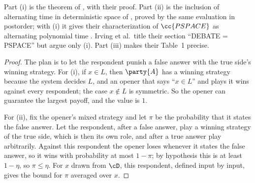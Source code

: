 \begin{refsection}
Part (i) is the theorem of \textcite{IrvingEtAl2018}, with their proof. Part (ii) is the inclusion of alternating time in deterministic space of \textcite[Theorem~3.2]{ChandraKozenStockmeyer1981}, proved by the same evaluation in postorder; with (i) it gives their characterization of $\cc{PSPACE}$ as alternating polynomial time \parencite[Corollary~3.6]{ChandraKozenStockmeyer1981}. Irving et al.\ title their section ``DEBATE = PSPACE'' but argue only (i). Part (iii) makes their Table~1 precise.


\begin{proof}
The plan is to let the respondent punish a false answer with the true side's winning strategy. For (i), if $x\in L$, then $\party{A}$ has a winning strategy because the system decides $L$, and an opener that says ``$x\in L$'' and plays it wins against every respondent; the case $x\notin L$ is symmetric. So the opener can guarantee the largest payoff, and the value is $1$.

For (ii), fix the opener's mixed strategy and let $\pi$ be the probability that it states the false answer. Let the respondent, after a false answer, play a winning strategy of the true side, which is then its own role, and after a true answer play arbitrarily. Against this respondent the opener loses whenever it states the false answer, so it wins with probability at most $1-\pi$; by hypothesis this is at least $1-\eta$, so $\pi\le\eta$. For $x$ drawn from $\cD$, this respondent, defined input by input, gives the bound for $\pi$ averaged over $x$.


\end{proof}
\end{refsection}
